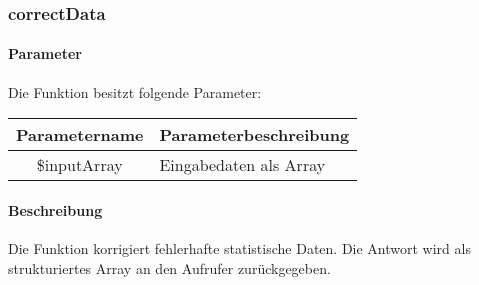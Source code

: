 \subsubsection{correctData}
\paragraph{Parameter} Die Funktion besitzt folgende Parameter:
\begin{table}[H]
	\begin{tabular}{|c|p{11cm}|}
		\hline
		\textbf{Parametername} & \textbf{Parameterbeschreibung} \\ \hline
		\$inputArray  & Eingabedaten als Array \\ \hline
	\end{tabular}
\end{table}
\paragraph{Beschreibung} Die Funktion korrigiert fehlerhafte statistische Daten. Die Antwort wird als strukturiertes Array an den Aufrufer zurückgegeben.